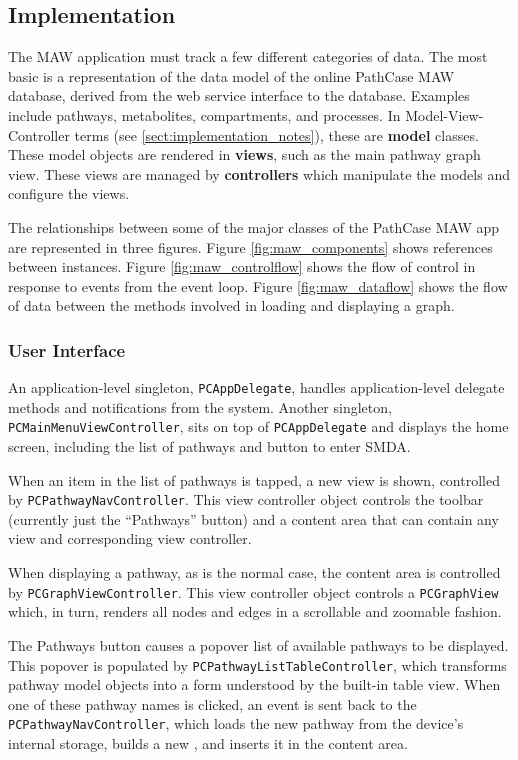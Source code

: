 \subsection{Implementation}
\label{sect:maw_implementation}

The MAW application must track a few different categories of data. The most
basic is a representation of the data model of the online PathCase MAW database,
derived from the web service interface to the database. Examples include
pathways, metabolites, compartments, and processes. In Model-View-Controller
terms (see \ref{sect:implementation_notes}), these are \textbf{model} classes.
These model objects are rendered in \textbf{views}, such as the main pathway
graph view.  These views are managed by \textbf{controllers} which manipulate
the models and configure the views.

The relationships between some of the major classes of the PathCase MAW app are
represented in three figures. Figure \ref{fig:maw_components} shows references
between instances. Figure \ref{fig:maw_controlflow} shows the flow of control in
response to events from the event loop. Figure \ref{fig:maw_dataflow} shows the
flow of data between the methods involved in loading and displaying a graph.

\subsubsection{User Interface}
\label{sect:maw_ui}

An application-level singleton, \texttt{PCAppDelegate}, handles
application-level delegate methods and notifications from the system. Another
singleton, \texttt{PCMainMenuViewController}, sits on top of
\texttt{PCAppDelegate} and displays the home screen, including the list of
pathways and button to enter SMDA.

When an item in the list of pathways is tapped, a new view is shown, controlled
by \texttt{PCPathwayNavController}. This view controller object controls the
toolbar (currently just the ``Pathways'' button) and a content area that can
contain any view and corresponding view controller.

When displaying a pathway, as is the normal case, the content area is controlled
by \texttt{PCGraphViewController}. This view controller object controls a
\texttt{PCGraphView} which, in turn, renders all nodes and edges in a scrollable
and zoomable fashion.

The Pathways button causes a popover list of available pathways to be displayed.
This popover is populated by \texttt{PCPathwayListTableController}, which
transforms pathway model objects into a form understood by the built-in table
view. When one of these pathway names is clicked, an event is sent back to
the \texttt{PCPathwayNavController}, which loads the new pathway from the
device's internal storage, builds a new , and
inserts it in the content area.


